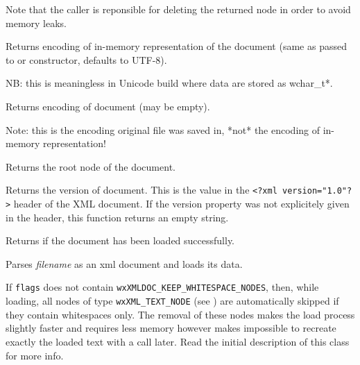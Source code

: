 Note that the caller is reponsible for deleting the returned node in order to avoid memory leaks.


\label{wxxmldocumentgetencoding}


Returns encoding of in-memory representation of the document
(same as passed to  or constructor, defaults to UTF-8).

NB: this is meaningless in Unicode build where data are stored as wchar\_t*.


\label{wxxmldocumentgetfileencoding}


Returns encoding of document (may be empty).

Note: this is the encoding original file was saved in, *not* the
encoding of in-memory representation!


\label{wxxmldocumentgetroot}


Returns the root node of the document.


\label{wxxmldocumentgetversion}


Returns the version of document.
This is the value in the {\tt <?xml version="1.0"?>} header of the XML document.
If the version property was not explicitely given in the header, this function
returns an empty string.


\label{wxxmldocumentisok}


Returns \true if the document has been loaded successfully.


\label{wxxmldocumentload}


Parses {\it filename} as an xml document and loads its data.

If {\tt flags} does not contain {\tt wxXMLDOC\_KEEP\_WHITESPACE\_NODES}, then, while loading, all nodes of
type {\tt wxXML\_TEXT\_NODE} (see ) are automatically skipped if they
contain whitespaces only.
The removal of these nodes makes the load process slightly faster and requires less memory however
makes impossible to recreate exactly the loaded text with a  call later.
Read the initial description of this class for more info.

